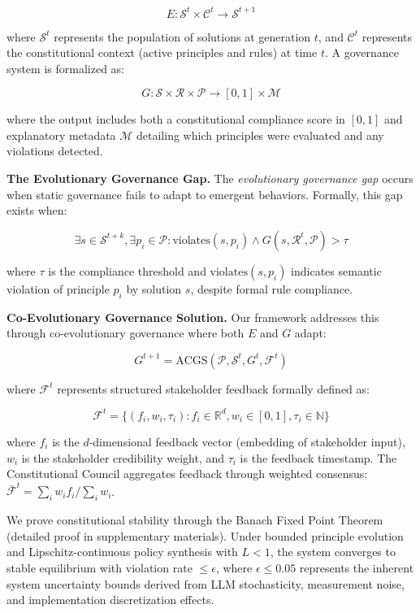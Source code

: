 \documentclass[manuscript,screen,review,anonymous,9pt]{acmart}
\begin{document}
$$E: \mathcal{S}^t \times \mathcal{C}^t \rightarrow \mathcal{S}^{t+1}$$

where $\mathcal{S}^t$ represents the population of solutions at generation $t$, and $\mathcal{C}^t$ represents the constitutional context (active principles and rules) at time $t$. A governance system is formalized as:

$$G: \mathcal{S} \times \mathcal{R} \times \mathcal{P} \rightarrow [0,1] \times \mathcal{M}$$

where the output includes both a constitutional compliance score in $[0,1]$ and explanatory metadata $\mathcal{M}$ detailing which principles were evaluated and any violations detected.

\textbf{The Evolutionary Governance Gap.} The \textit{evolutionary governance gap} occurs when static governance fails to adapt to emergent behaviors. Formally, this gap exists when:

$$\exists s \in \mathcal{S}^{t+k}, \exists p_i \in \mathcal{P}: \text{violates}(s, p_i) \land G(s, \mathcal{R}^t, \mathcal{P}) > \tau$$

where $\tau$ is the compliance threshold and $\text{violates}(s, p_i)$ indicates semantic violation of principle $p_i$ by solution $s$, despite formal rule compliance.

\textbf{Co-Evolutionary Governance Solution.} Our framework addresses this through co-evolutionary governance where both $E$ and $G$ adapt:

$$G^{t+1} = \text{ACGS}(\mathcal{P}, \mathcal{S}^t, G^t, \mathcal{F}^t)$$

where $\mathcal{F}^t$ represents structured stakeholder feedback formally defined as:

$$\mathcal{F}^t = \{(f_i, w_i, \tau_i) : f_i \in \mathbb{R}^d, w_i \in [0,1], \tau_i \in \mathbb{N}\}$$

where $f_i$ is the $d$-dimensional feedback vector (embedding of stakeholder input), $w_i$ is the stakeholder credibility weight, and $\tau_i$ is the feedback timestamp. The Constitutional Council aggregates feedback through weighted consensus: $\bar{\mathcal{F}}^t = \sum_{i} w_i f_i / \sum_{i} w_i$.

We prove constitutional stability through the Banach Fixed Point Theorem (detailed proof in supplementary materials). Under bounded principle evolution and Lipschitz-continuous policy synthesis with $L < 1$, the system converges to stable equilibrium with violation rate $\leq \epsilon$, where $\epsilon \leq 0.05$ represents the inherent system uncertainty bounds derived from LLM stochasticity, measurement noise, and implementation discretization effects.
\end{document}
